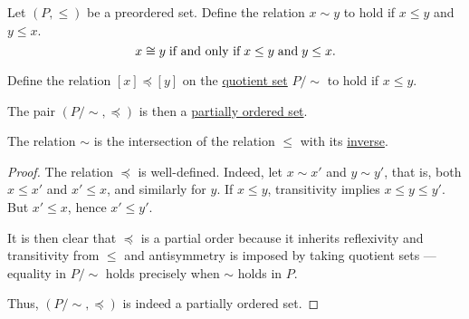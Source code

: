 \begin{proposition}\label{thm:preorder_to_partial_order}
  Let \( (P, \leq) \) be a preordered set. Define the relation \( x \sim y \) to hold if \( x \leq y \) and \( y \leq x \).
  \begin{equation}\label{eq:thm:preorder_to_partial_order/equivalence}
    x \cong y \T{if and only if} x \leq y \T{and} y \leq x.
  \end{equation}

  Define the relation \( [x] \preceq [y] \) on the \hyperref[def:equivalence_relation/quotient]{quotient set} \( P / \sim \) to hold if \( x \leq y \).

  The pair \( (P / \sim, \preceq) \) is then a \hyperref[def:partially_ordered_set]{partially ordered set}.
\end{proposition}
\begin{comments}
  \item The relation \( \sim \) is the intersection of the relation \( \leq \) with its \hyperref[def:binary_relation/converse]{inverse}.
\end{comments}
\begin{proof}
  The relation \( \preceq \) is well-defined. Indeed, let \( x \sim x' \) and \( y \sim y' \), that is, both \( x \leq x' \) and \( x' \leq x \), and similarly for \( y \). If \( x \leq y \), transitivity implies \( x \leq y \leq y' \). But \( x' \leq x \), hence \( x' \leq y' \).

  It is then clear that \( \preceq \) is a partial order because it inherits reflexivity and transitivity from \( \leq \) and antisymmetry is imposed by taking quotient sets --- equality in \( P / \sim \) holds precisely when \( \sim \) holds in \( P \).

  Thus, \( (P / \sim, \preceq) \) is indeed a partially ordered set.
\end{proof}

